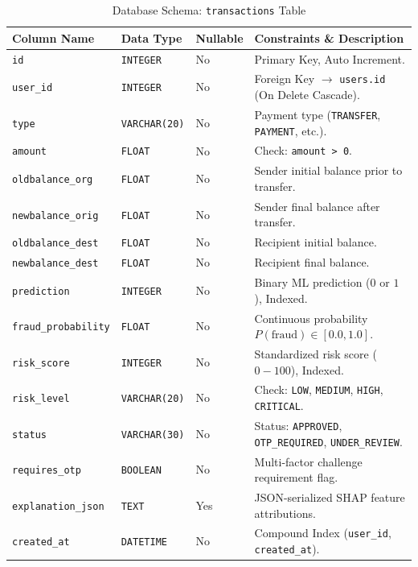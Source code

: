 \begin{table}[h]
\centering
\caption{Database Schema: \texttt{transactions} Table}
\label{tab:transactions_schema}
\begin{tabularx}{\textwidth}{lp{2.8cm}p{1.8cm}X}
\toprule
\textbf{Column Name} & \textbf{Data Type} & \textbf{Nullable} & \textbf{Constraints \& Description} \\
\midrule
\texttt{id} & \texttt{INTEGER} & No & Primary Key, Auto Increment. \\
\texttt{user\_id} & \texttt{INTEGER} & No & Foreign Key $\to$ \texttt{users.id} (On Delete Cascade). \\
\texttt{type} & \texttt{VARCHAR(20)} & No & Payment type (\texttt{TRANSFER}, \texttt{PAYMENT}, etc.). \\
\texttt{amount} & \texttt{FLOAT} & No & Check: \texttt{amount > 0}. \\
\texttt{oldbalance\_org} & \texttt{FLOAT} & No & Sender initial balance prior to transfer. \\
\texttt{newbalance\_orig} & \texttt{FLOAT} & No & Sender final balance after transfer. \\
\texttt{oldbalance\_dest}& \texttt{FLOAT} & No & Recipient initial balance. \\
\texttt{newbalance\_dest}& \texttt{FLOAT} & No & Recipient final balance. \\
\texttt{prediction} & \texttt{INTEGER} & No & Binary ML prediction ($0$ or $1$), Indexed. \\
\texttt{fraud\_probability}& \texttt{FLOAT} & No & Continuous probability $P(\text{fraud}) \in [0.0, 1.0]$. \\
\texttt{risk\_score} & \texttt{INTEGER} & No & Standardized risk score ($0-100$), Indexed. \\
\texttt{risk\_level} & \texttt{VARCHAR(20)} & No & Check: \texttt{LOW}, \texttt{MEDIUM}, \texttt{HIGH}, \texttt{CRITICAL}. \\
\texttt{status} & \texttt{VARCHAR(30)} & No & Status: \texttt{APPROVED}, \texttt{OTP\_REQUIRED}, \texttt{UNDER\_REVIEW}. \\
\texttt{requires\_otp} & \texttt{BOOLEAN} & No & Multi-factor challenge requirement flag. \\
\texttt{explanation\_json}& \texttt{TEXT} & Yes & JSON-serialized SHAP feature attributions. \\
\texttt{created\_at} & \texttt{DATETIME} & No & Compound Index (\texttt{user\_id}, \texttt{created\_at}). \\
\bottomrule
\end{tabularx}
\end{table}

